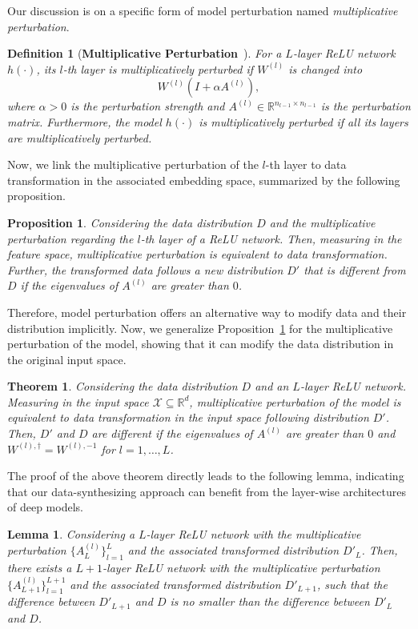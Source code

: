 \documentclass{article} \usepackage{iclr2022_conference,times}
\newtheorem{theorem}{Theorem}
\newtheorem{definition}{Definition}
\newtheorem{lemma}{Lemma}
\newtheorem{proposition}{Proposition}
\begin{document}
Our discussion is on a specific form of model perturbation named \emph{multiplicative perturbation}.
\begin{definition}[\textbf{Multiplicative Perturbation}~\citep{PetzkaKASB21}]
For a $L$-layer ReLU network $h(\cdot)$, its $l$-th layer is multiplicatively perturbed if $W^{(l)}$ is changed into
\begin{equation}
    W^{(l)}(I+\alpha A^{(l)}),
\end{equation}
where $\alpha>0$ is the perturbation strength and $A^{(l)}\in\mathbb{R}^{n_{l-1}\times n_{l-1}}$ is the perturbation matrix. Furthermore, the model $h(\cdot)$ is multiplicatively perturbed if all its layers are multiplicatively perturbed.
\end{definition}



Now, we link the multiplicative perturbation of the $l$-th layer to data transformation in the associated embedding space, summarized by the following proposition. 
\begin{proposition} \label{prop1}
{Considering the data distribution $D$ and the multiplicative perturbation regarding the $l$-th layer of a ReLU network. Then, measuring in the feature space, multiplicative perturbation is equivalent to data transformation. Further, the transformed data follows a new distribution ${D}'$ that is different from $D$ if the eigenvalues of $A^{(l)}$ are greater than $0$.} 
\end{proposition}
Therefore, model perturbation offers an alternative way to modify data and their distribution implicitly. Now, we generalize Proposition~\ref{prop1} for the multiplicative perturbation of the model, showing that it can modify the data distribution in the original input space. 
\begin{theorem} \label{theo2}
{Considering the data distribution $D$ and an $L$-layer ReLU network. Measuring in the input space $\mathcal{X}\subseteq\mathbb{R}^{d}$, multiplicative perturbation of the model is equivalent to data transformation in the input space following distribution ${D}'$. Then, $D'$ and ${D}$ are different if the eigenvalues of $A^{(l)}$ are greater than $0$ and $W^{(l),\dagger}=W^{(l),-1}$ for $l=1,\ldots,L$.} 

\end{theorem}
The proof of the above theorem directly leads to the following lemma, indicating that our data-synthesizing approach can benefit from the layer-wise architectures of deep models. 
\begin{lemma} \label{lemma3}
Considering a $L$-layer ReLU network with the multiplicative perturbation $\{A^{(l)}_L\}_{l=1}^L$ and the associated transformed distribution $D'_{L}$. Then, there exists a $L+1$-layer ReLU network with the multiplicative perturbation $\{A^{(l)}_{L+1}\}_{l=1}^{L+1}$ and the associated transformed distribution $D'_{L+1}$, such that the difference between $D'_{L+1}$  and $D$ is no smaller than the difference between  $D'_{L}$  and $D$.
\end{lemma}
\end{document}
